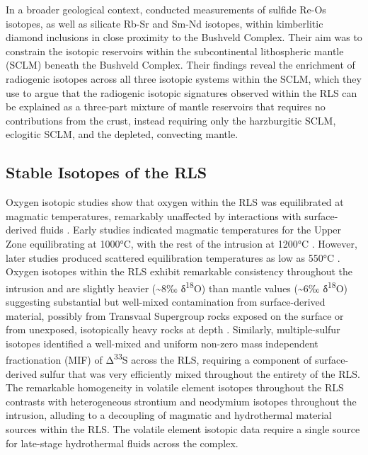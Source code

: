 In a broader geological context, \citet{richardson2008} conducted
measurements of sulfide Re-Os isotopes, as well as silicate Rb-Sr and
Sm-Nd isotopes, within kimberlitic diamond inclusions in close proximity
to the Bushveld Complex. Their aim was to constrain the isotopic
reservoirs within the subcontinental lithospheric mantle (SCLM) beneath
the Bushveld Complex. Their findings reveal the enrichment of radiogenic
isotopes across all three isotopic systems within the SCLM, which they
use to argue that the radiogenic isotopic signatures observed within the
RLS can be explained as a three-part mixture of mantle reservoirs that
requires no contributions from the crust, instead requiring only the
harzburgitic SCLM, eclogitic SCLM, and the depleted, convecting mantle.

\subsection{Stable Isotopes of the RLS}
\label{sec:ch5-stable-isotopes-of-the-rls}

Oxygen isotopic studies show that oxygen within the RLS was equilibrated
at magmatic temperatures, remarkably unaffected by interactions with
surface-derived fluids \citep{schiffries1989,harris2005}.
Early studies indicated magmatic temperatures for the Upper Zone
equilibrating at 1000°C, with the rest of the intrusion at 1200°C
\citep{schiffries1989}. However, later studies produced scattered
equilibration temperatures as low as 550°C \citep{harris2005}. Oxygen
isotopes within the RLS exhibit remarkable consistency throughout the
intrusion and are slightly heavier (\textasciitilde8‰
δ\textsuperscript{18}O) than mantle values (\textasciitilde6‰
δ\textsuperscript{18}O) suggesting substantial but well-mixed
contamination from surface-derived material, possibly from Transvaal
Supergroup rocks exposed on the surface or from unexposed, isotopically
heavy rocks at depth \citep{schiffries1989,harris2005}.
Similarly, multiple-sulfur isotopes identified a well-mixed and uniform
non-zero mass independent fractionation (MIF) of Δ\textsuperscript{33}S
\citep{pennistondorland2012} across the RLS, requiring a component
of surface-derived sulfur that was very efficiently mixed throughout the
entirety of the RLS. The remarkable homogeneity in volatile element
isotopes throughout the RLS contrasts with heterogeneous strontium and
neodymium isotopes throughout the intrusion, alluding to a decoupling of
magmatic and hydrothermal material sources within the RLS. The volatile
element isotopic data require a single source for late-stage
hydrothermal fluids across the complex.

